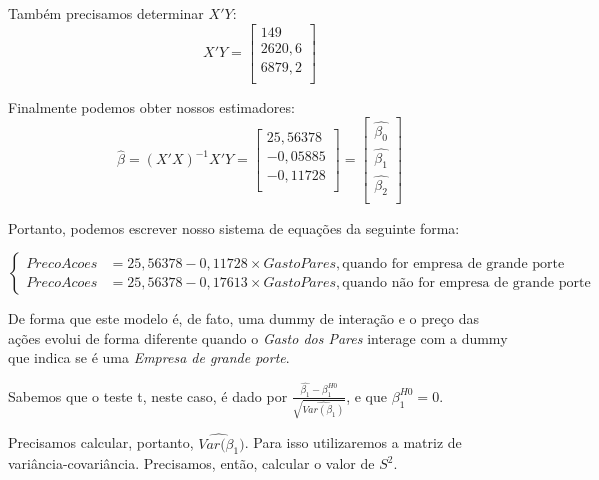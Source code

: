 \documentclass[]{ufpe-exercises}
\begin{document}
\begin{questions}
\begin{parts}
\begin{solution}
			Também precisamos determinar \(X'Y\):
			\[
				X'Y =
				\begin{bmatrix}
					149    \\
					2620,6 \\
					6879,2 \\
				\end{bmatrix}
			\]

			Finalmente podemos obter nossos estimadores:
			\[
				\hat{\beta} = (X'X)^{-1}X'Y =
				\begin{bmatrix}
					25,56378 \\
					-0,05885 \\
					-0,11728 \\
				\end{bmatrix} =
				\begin{bmatrix}
					\hat{\beta_{0}} \\
					\hat{\beta_{1}} \\
					\hat{\beta_{2}} \\
				\end{bmatrix}
			\]

			Portanto, podemos escrever nosso sistema de equações da seguinte forma:

			\begin{equation*}
				\begin{cases}
					PrecoAcoes & = 25,56378 - 0,11728 \times GastoPares, \text{quando for empresa de grande porte}     \\
					PrecoAcoes & = 25,56378 - 0,17613 \times GastoPares, \text{quando não for empresa de grande porte}
				\end{cases}
			\end{equation*}

			De forma que este modelo é, de fato, uma dummy de interação e o preço das ações evolui de forma diferente quando o \textit{Gasto dos Pares} interage com a dummy que indica se é uma \textit{Empresa de grande porte}.

			Sabemos que o teste t, neste caso, é dado por \(\frac{\hat{\beta_{1}} - \beta^{H0}_{1}}{\sqrt{\widehat{Var(\beta_{1})}}}\), e que \(\beta^{H0}_{1} = 0\).

			Precisamos calcular, portanto, \(\widehat{Var(\beta_{1}})\). Para isso utilizaremos a matriz de variância-covariância. Precisamos, então, calcular o valor de \(S^{2}\).


\end{solution}
\end{parts}
\end{questions}
\end{document}
